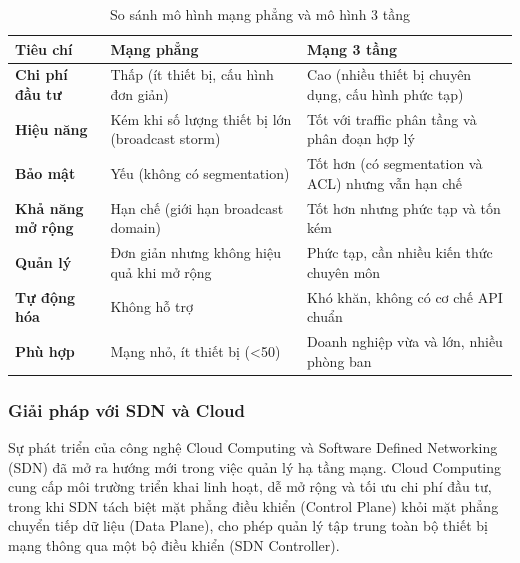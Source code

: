 \begin{table}[H]
\centering
\caption{So sánh mô hình mạng phẳng và mô hình 3 tầng}
\label{tab:network_comparison}
\begin{tabular}{|p{4cm}|p{6cm}|p{6cm}|}
\hline
\textbf{Tiêu chí} & \textbf{Mạng phẳng} & \textbf{Mạng 3 tầng} \\
\hline
\textbf{Chi phí đầu tư} & Thấp (ít thiết bị, cấu hình đơn giản) & Cao (nhiều thiết bị chuyên dụng, cấu hình phức tạp) \\
\hline
\textbf{Hiệu năng} & Kém khi số lượng thiết bị lớn (broadcast storm) & Tốt với traffic phân tầng và phân đoạn hợp lý \\
\hline
\textbf{Bảo mật} & Yếu (không có segmentation) & Tốt hơn (có segmentation và ACL) nhưng vẫn hạn chế \\
\hline
\textbf{Khả năng mở rộng} & Hạn chế (giới hạn broadcast domain) & Tốt hơn nhưng phức tạp và tốn kém \\
\hline
\textbf{Quản lý} & Đơn giản nhưng không hiệu quả khi mở rộng & Phức tạp, cần nhiều kiến thức chuyên môn \\
\hline
\textbf{Tự động hóa} & Không hỗ trợ & Khó khăn, không có cơ chế API chuẩn \\
\hline
\textbf{Phù hợp} & Mạng nhỏ, ít thiết bị (<50) & Doanh nghiệp vừa và lớn, nhiều phòng ban \\
\hline
\end{tabular}
\end{table}

\subsubsection{Giải pháp với SDN và Cloud}
Sự phát triển của công nghệ Cloud Computing và Software Defined Networking (SDN) đã mở ra hướng mới trong việc quản lý hạ tầng mạng. Cloud Computing cung cấp môi trường triển khai linh hoạt, dễ mở rộng và tối ưu chi phí đầu tư, trong khi SDN tách biệt mặt phẳng điều khiển (Control Plane) khỏi mặt phẳng chuyển tiếp dữ liệu (Data Plane), cho phép quản lý tập trung toàn bộ thiết bị mạng thông qua một bộ điều khiển (SDN Controller).

